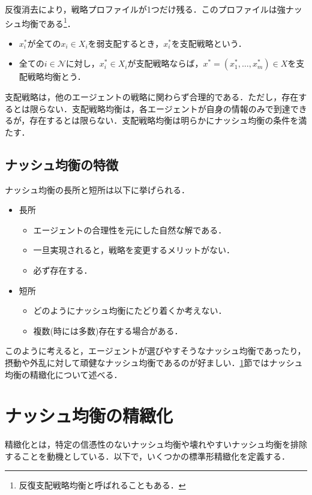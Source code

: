 \documentclass{jsreport}
\begin{document}
反復消去により，戦略プロファイルが1つだけ残る．このプロファイルは強ナッシュ均衡である\footnote{反復支配戦略均衡と呼ばれることもある．}．

\begin{screen}
  \begin{defi}
    \begin{itemize}
      \item $x_i^{*}$が全ての$x_i \in X_i$を弱支配するとき，$x_i^{*}$を支配戦略という．
      \item 全ての$i \in \mathcal{N}$に対し，$x_i^{*} \in X_i$が支配戦略ならば，$x^{*} = (x_1^{*}, \ldots, x_m^{*}) \in X$を支配戦略均衡とう．
    \end{itemize}
  \end{defi}
\end{screen}

支配戦略は，他のエージェントの戦略に関わらず合理的である．ただし，存在するとは限らない．支配戦略均衡は，各エージェントが自身の情報のみで到達できるが，存在するとは限らない．支配戦略均衡は明らかにナッシュ均衡の条件を満たす．

\subsection{ナッシュ均衡の特徴}
ナッシュ均衡の長所と短所は以下に挙げられる．
\begin{itemize}
  \item 長所
  \begin{itemize}
    \item エージェントの合理性を元にした自然な解である．
    \item 一旦実現されると，戦略を変更するメリットがない．
    \item 必ず存在する．
  \end{itemize}
  \item 短所
  \begin{itemize}
    \item どのようにナッシュ均衡にたどり着くか考えない．
    \item 複数(時には多数)存在する場合がある．
  \end{itemize}
\end{itemize}
このように考えると，エージェントが選びやすそうなナッシュ均衡であったり，摂動や外乱に対して頑健なナッシュ均衡であるのが好ましい．\ref{sec:refine}節ではナッシュ均衡の精緻化について述べる．

\section{ナッシュ均衡の精緻化}\label{sec:refine}
精緻化とは，特定の信憑性のないナッシュ均衡や壊れやすいナッシュ均衡を排除することを動機としている．以下で，いくつかの標準形精緻化を定義する．
\end{document}
